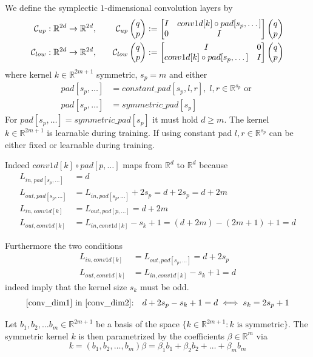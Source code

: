 \documentclass[twoside,a4paper]{article}
\begin{document}

We define the symplectic $1$-dimensional convolution layers by
\begin{alignat*}{2}
	\mathcal{C}_{up} &: \mathbb{R}^{2d} \to \mathbb{R}^{2d},
	\quad&\mathcal{C}_{up} \begin{pmatrix} q \\ p \end{pmatrix} := \begin{bmatrix} I & {conv1d[k] \circ pad[s_p,\dots]} \\ 0 & I \end{bmatrix} \begin{pmatrix} q \\ p \end{pmatrix} \\
	\mathcal{C}_{low} &: \mathbb{R}^{2d} \to \mathbb{R}^{2d},
	&\mathcal{C}_{low} \begin{pmatrix} q \\ p \end{pmatrix} := \begin{bmatrix} I & 0 \\ {conv1d[k] \circ pad[s_p,\dots]} & I \end{bmatrix} \begin{pmatrix} q \\ p \end{pmatrix}
\end{alignat*}
where kernel $k \in \mathbb{R}^{2m+1}$ symmetric, $s_p = m$ and either
\begin{align*}
	pad[s_p,\dots] &= constant\_pad[s_p,l,r],\; l,r \in \mathbb{R}^{s_p} \text{ or } \\
	pad[s_p,\dots] &= symmetric\_pad[s_p]
\end{align*}
For $pad[s_p,\dots] = symmetric\_pad[s_p]$ it must hold $d \geq m$.
The kernel $k \in \mathbb{R}^{2m+1}$ is learnable during training.
If using constant pad $l,r \in \mathbb{R}^{s_p}$ can be either fixed or learnable during training.

Indeed $conv1d[k] \circ pad[p,\dots]$ maps from $\mathbb{R}^d$ to $\mathbb{R}^d$ because
\begin{align*}
	L_{in,pad[s_p,\dots]} &= d \\
	L_{out,pad[s_p,\dots]} &= L_{in,pad[s_p,\dots]} + 2s_p = d+2s_p = d+2m \\
	L_{in,conv1d[k]} &= L_{out,pad[p,\dots]} = d+2m \\
	L_{out,conv1d[k]} &= L_{in,conv1d[k]} - s_k + 1 = (d+2m) - (2m+1) + 1 = d
\end{align*}

Furthermore the two conditions
\begin{align}
	L_{in,conv1d[k]} &= L_{out,pad[s_p,\dots]} = d+2s_p \label{conv_dim1} \\ 
	L_{out,conv1d[k]} &= L_{in,conv1d[k]} - s_k + 1 = d \label{conv_dim2}
\end{align}
indeed imply that the kernel size $s_k$ must be odd.
\begin{equation*}
	\text{\cref{conv_dim1} in \cref{conv_dim2}:} \quad d+2s_p - s_k + 1 = d \iff s_k = 2s_p+1
\end{equation*}

Let ${b_1, b_2, \dots b_m} \in \mathbb{R}^{2m+1}$ be a basis of the space 
$\{ k \in \mathbb{R}^{2m+1} : k \text{ is symmetric} \}$.
The symmetric kernel $k$ is then parametrized by the coefficients $\beta \in \mathbb{R}^m$ via
\begin{equation*}
	k = (b_1, b_2, \dots, b_m) \beta = \beta_1 b_1 + \beta_2 b_2 + \dots + \beta_m b_m
\end{equation*}
\end{document}
